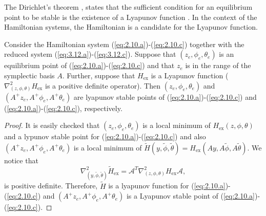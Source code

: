 {The Dirichlet's theorem \cite{bhatia2002stability}, states that the sufficient condition for an equilibrium point to be stable is the existence of a Lyapunov function \cite{bhatia2002stability}. In the context of the Hamiltonian systems, the Hamiltonian is a candidate for the Lyapunov function.

\begin{theorem}
Consider the Hamiltonian system (\ref{eq:2.10.a})-(\ref{eq:2.10.c}) together with the reduced system (\ref{eq:3.12.a})-(\ref{eq:3.12.c}). Suppose that $(z_e,\phi_e,\theta_e)$ is an equilibrium point of (\ref{eq:2.10.a})-(\ref{eq:2.10.c}) and that $z_e$ is in the range of the symplectic basis $A$. Further, suppose that $H_{\text{ex}}$ is a Lyapunov function ($\nabla^2_{(z,\phi,\theta)}H_{\text{ex}}$ is a positive definite operator). Then $(z_e,\phi_e,\theta_e)$ and $(A^+z_e,A^+\phi_e,A^+\theta_e)$ are lyapunov stable points of (\ref{eq:2.10.a})-(\ref{eq:2.10.c}) and (\ref{eq:2.10.a})-(\ref{eq:2.10.c}), respectively.
\end{theorem}
\begin{proof} It is easily checked that $(z_e,\phi_e,\theta_e)$ is a local minimum of $H_{\text{ex}}(z,\phi,\theta)$ and a lypunov stable point for (\ref{eq:2.10.a})-(\ref{eq:2.10.c}) and also $(A^+z_e,A^+\phi_e,A^+\theta_e)$ is a local minimum of $\tilde H(y,\tilde \phi,\tilde \theta) = H_{\text{ex}}(Ay,A\tilde \phi,A\tilde \theta)$. We notice that
\begin{equation}
	\nabla^2_{(y,\tilde \phi,\tilde \theta)}\tilde H_{\text{ex}} = \mathcal A^T \nabla^2_{(z,\phi,\theta)}H_{\text{ex}} \mathcal A,
\end{equation}
is positive definite. Therefore, $\tilde H$ is a lyapunov function for (\ref{eq:2.10.a})-(\ref{eq:2.10.c}) and $(A^+z_e,A^+\phi_e,A^+\theta_e)$ is a Lyapunov stable point of  (\ref{eq:2.10.a})-(\ref{eq:2.10.c}).
\end{proof}
}
